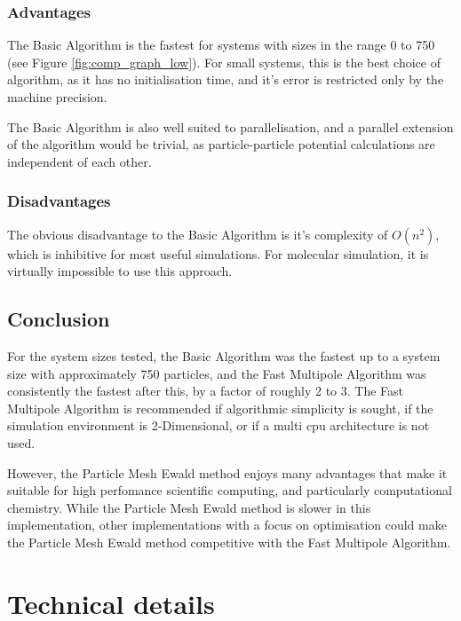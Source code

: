 \documentclass[pdftex,twoside,a4paper]{report}
\newcommand{\pmem}{Particle Mesh Ewald method}
\newcommand{\fma}{Fast Multipole Algorithm}
\begin{document}
\subsection{Advantages}
The Basic Algorithm is the fastest for systems with sizes in the range 0 to 750 (see Figure \ref{fig:comp_graph_low}). For small systems, this is the best choice of algorithm, as it has no initialisation time, and it's error is restricted only by the machine precision.

The Basic Algorithm is also well suited to parallelisation, and a parallel extension of the algorithm would be trivial, as particle-particle potential calculations are independent of each other.
\subsection{Disadvantages}
The obvious disadvantage to the Basic Algorithm is it's complexity of $O(n^2)$, which is inhibitive for most useful simulations. For molecular simulation, it is virtually impossible to use this approach.
\section{Conclusion}
For the system sizes tested, the Basic Algorithm was the fastest up to a system size with approximately 750 particles, and the \fma{} was consistently the fastest after this, by a factor of roughly 2 to 3. The \fma{} is recommended if algorithmic simplicity is sought, if the simulation environment is 2-Dimensional, or if a multi cpu architecture is not used.

However, the \pmem{} enjoys many advantages that make it suitable for high perfomance scientific computing, and particularly computational chemistry. While the \pmem{} is slower in this implementation, other implementations with a focus on optimisation could make the \pmem{} competitive with the \fma{}. 

\appendix
\chapter{Technical details}
\label{ap:implement}
\end{document}

